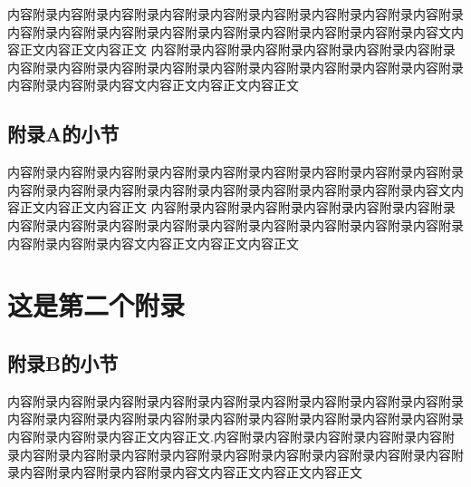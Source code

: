 \documentclass[UTF8,openany,twoside,12pt]{book}
\theoremstyle{plain}
\begin{document}
内容附录内容附录内容附录内容附录内容附录内容附录内容附录内容附录内容附录内容附录内容附录内容附录内容附录内容附录内容附录内容附录内容附录内容文内容正文内容正文内容正文
内容附录内容附录内容附录内容附录内容附录内容附录内容附录内容附录内容附录内容附录内容附录内容附录内容附录内容附录内容附录内容附录内容附录内容文内容正文内容正文内容正文

\clearpage
\section{附录A的小节}

内容附录内容附录内容附录内容附录内容附录内容附录内容附录内容附录内容附录内容附录内容附录内容附录内容附录内容附录内容附录内容附录内容附录内容文内容正文内容正文内容正文
内容附录内容附录内容附录内容附录内容附录内容附录内容附录内容附录内容附录内容附录内容附录内容附录内容附录内容附录内容附录内容附录内容附录内容文内容正文内容正文内容正文

\chapter{这是第二个附录}
\section{附录B的小节}


内容附录内容附录内容附录内容附录内容附录内容附录内容附录内容附录内容附录内容附录内容附录内容附录内容附录内容附录内容附录内容附录内容附录内容附录内容附录内容附录内容正文内容正文.内容附录内容附录内容附录内容附录内容附录内容附录内容附录内容附录内容附录内容附录内容附录内容附录内容附录内容附录内容附录内容附录内容附录内容文内容正文内容正文内容正文




\backmatter  %



\renewcommand{\bibname}{参考文献}

\clearpage
{}
{} %


% 
\setlength{\bibsep}{1ex}

%

\end{document}
